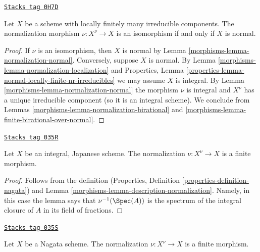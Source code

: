 \begin{lemma}
\label{morphisms-lemma-normalization-trivial}
\href{https://stacks.math.columbia.edu/tag/0H7D}{\texttt{Stacks tag 0H7D}}

Let $X$ be a scheme with locally finitely many irreducible components.
The normalization morphism $\nu : X^\nu \to X$ is an isomorphism
if and only if $X$ is normal.
\end{lemma}

\begin{proof}

If $\nu$ is an isomorphism, then $X$ is normal by
Lemma \ref{morphisms-lemma-normalization-normal}.
Conversely, suppose $X$ is normal.
By Lemma \ref{morphisms-lemma-normalization-localization} and
Properties, Lemma \ref{properties-lemma-normal-locally-finite-nr-irreducibles}
we may assume $X$ is integral.
By Lemma \ref{morphisms-lemma-normalization-normal} the morphism
$\nu$ is integral and $X^\nu$ has a unique irreducible component
(so it is an integral scheme).
We conclude from Lemmas \ref{morphisms-lemma-normalization-birational} and
\ref{morphisms-lemma-finite-birational-over-normal}.
\end{proof}

\begin{lemma}
\label{morphisms-lemma-Japanese-normalization}
\href{https://stacks.math.columbia.edu/tag/035R}{\texttt{Stacks tag 035R}}

Let $X$ be an integral, Japanese scheme.
The normalization $\nu : X^\nu \to X$ is a finite morphism.
\end{lemma}

\begin{proof}

Follows from the definition
(Properties, Definition \ref{properties-definition-nagata}) and
Lemma \ref{morphisms-lemma-description-normalization}. Namely, in this case
the lemma says that $\nu^{-1}(\Spec(A))$ is the spectrum
of the integral closure of $A$ in its field of fractions.
\end{proof}

\begin{lemma}
\label{morphisms-lemma-nagata-normalization}
\href{https://stacks.math.columbia.edu/tag/035S}{\texttt{Stacks tag 035S}}

Let $X$ be a Nagata scheme.
The normalization $\nu : X^\nu \to X$ is a finite morphism.
\end{lemma}

